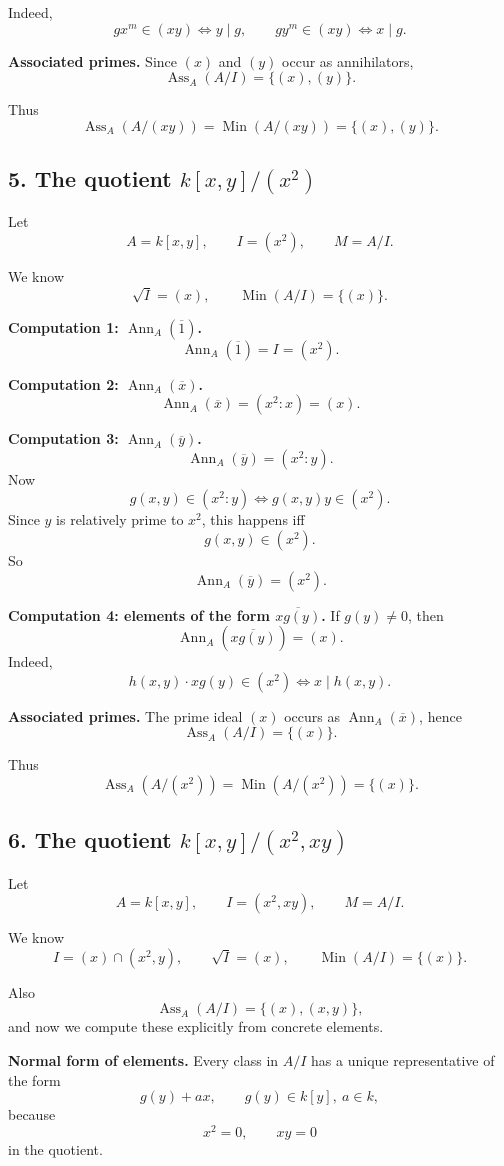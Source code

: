 \documentclass[12pt,a4paper]{article}
\theoremstyle{notespace}
\DeclareMathOperator{\Ass}{Ass}
\DeclareMathOperator{\Ann}{Ann}
\DeclareMathOperator{\Min}{Min}
\begin{document}
Indeed,
\[
g x^m\in (xy)\iff y\mid g,
\qquad
g y^m\in (xy)\iff x\mid g.
\]

\textbf{Associated primes.}
Since \((x)\) and \((y)\) occur as annihilators,
\[
\Ass_A(A/I)=\{(x),(y)\}.
\]

Thus
\[
\Ass_A(A/(xy))=\Min(A/(xy))=\{(x),(y)\}.
\]

\subsection*{5. The quotient \(k[x,y]/(x^2)\)}

Let
\[
A=k[x,y],\qquad I=(x^2),\qquad M=A/I.
\]

We know
\[
\sqrt I=(x),
\qquad
\Min(A/I)=\{(x)\}.
\]

\textbf{Computation 1: \(\Ann_A(\overline 1)\).}
\[
\Ann_A(\overline 1)=I=(x^2).
\]

\textbf{Computation 2: \(\Ann_A(\overline x)\).}
\[
\Ann_A(\overline x)=(x^2:x)=(x).
\]

\textbf{Computation 3: \(\Ann_A(\overline y)\).}
\[
\Ann_A(\overline y)=(x^2:y).
\]
Now
\[
g(x,y)\in (x^2:y)
\iff g(x,y)y\in (x^2).
\]
Since \(y\) is relatively prime to \(x^2\), this happens iff
\[
g(x,y)\in (x^2).
\]
So
\[
\Ann_A(\overline y)=(x^2).
\]

\textbf{Computation 4: elements of the form \(\overline{xg(y)}\).}
If \(g(y)\neq 0\), then
\[
\Ann_A(\overline{xg(y)})=(x).
\]
Indeed,
\[
h(x,y)\cdot xg(y)\in (x^2)
\iff x\mid h(x,y).
\]

\textbf{Associated primes.}
The prime ideal \((x)\) occurs as \(\Ann_A(\overline x)\), hence
\[
\Ass_A(A/I)=\{(x)\}.
\]

Thus
\[
\Ass_A(A/(x^2))=\Min(A/(x^2))=\{(x)\}.
\]

\subsection*{6. The quotient \(k[x,y]/(x^2,xy)\)}

Let
\[
A=k[x,y],\qquad I=(x^2,xy),\qquad M=A/I.
\]

We know
\[
I=(x)\cap(x^2,y),
\qquad
\sqrt I=(x),
\qquad
\Min(A/I)=\{(x)\}.
\]

Also
\[
\Ass_A(A/I)=\{(x),(x,y)\},
\]
and now we compute these explicitly from concrete elements.

\medskip

\textbf{Normal form of elements.}
Every class in \(A/I\) has a unique representative of the form
\[
g(y)+ax,
\qquad g(y)\in k[y],\ a\in k,
\]
because
\[
x^2=0,\qquad xy=0
\]
in the quotient.
\end{document}
